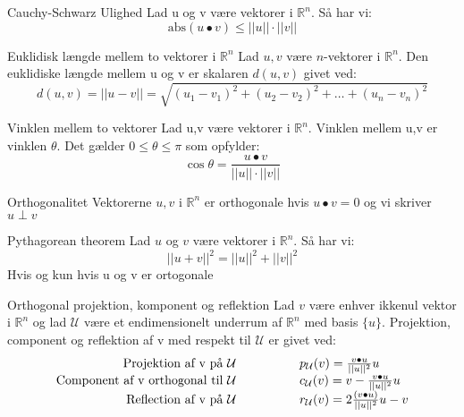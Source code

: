 \documentclass[a4paper,fleqn]{article}
\newcommand{\RR}{\mathbb{R}}
\newcommand{\U}{\mathcal{U}}
\begin{document}
	\begin{theorem}{Cauchy-Schwarz Ulighed}{}
		Lad u og v være vektorer i $\RR^n$. Så har vi:
		\[ \text{abs}(u\bullet v) \leq ||u||\cdot||v||\]
	\end{theorem}
	\begin{definition}{Euklidisk længde mellem to vektorer i $\RR^n$}{}
		Lad $u,v$ være $n$-vektorer i $\RR^n$. Den euklidiske længde mellem u og v er
		skalaren $d(u,v)$ givet ved:
		\[d(u,v) = ||u - v|| = \sqrt{(u_1-v_1)^2 + (u_2-v_2)^2 + \dots + (u_n - v_n)^2}\]
	\end{definition}
	\begin{definition}{Vinklen mellem to vektorer}{}
		Lad u,v være vektorer i $\RR^n$. Vinklen mellem u,v er vinklen $\theta$. Det gælder
		$0 \leq \theta \leq \pi$ som opfylder:
		\[ \cos\theta=\frac{u\bullet v}{||u||\cdot||v||}\]
	\end{definition}
	\begin{definition}{Orthogonalitet}{}
		Vektorerne $u,v$ i $\RR^n$ er orthogonale hvis $u \bullet v = 0$ og vi skriver
		$u \perp v$ 
	\end{definition}
	\begin{theorem}{Pythagorean theorem}{}
		Lad $u$ og $v$ være vektorer i $\RR^n$. Så har vi:
		\[||u+v||^2 = ||u||^2 + ||v||^2\]
		Hvis og kun hvis u og v er ortogonale
	\end{theorem}
	\begin{definition}{Orthogonal projektion, komponent og reflektion}{}
		Lad $v$ være enhver ikkenul vektor i $\RR^n$ og lad $\U$ være et endimensionelt
		underrum af $\RR^n$ med basis $\{u\}$. Projektion, component og reflektion af v
		med respekt til $\U$ er givet ved:
		\begin{equation}\begin{array}{r@{\hspace{0.7in}}l}
			\text{Projektion af v på }\U & p_\U(v) = \frac{v\bullet u}{||u||^2}u\\
			\text{Component af v orthogonal til }\U &c_\U(v)=v-\frac{v\bullet u}
			{||u||^2}u\\
			\text{Reflection af v på }\U&r_\U(v)=2\frac{(v\bullet u)}{||u||^2}u-v
		\end{array}\end{equation}
	\end{definition}
\end{document}

